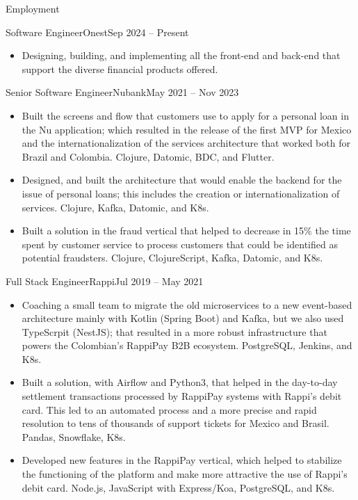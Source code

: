 \documentclass[calibri]{../macdowell-cv/mcdowellcv}
\begin{document}
	\makeheader
	
	\begin{cvsection}{Employment}
		\begin{cvsubsection}{Software Engineer}{Onest}{Sep 2024 -- Present}
			\begin{itemize}
                \item Designing, building, and implementing all the front-end
                    and back-end that support the diverse financial products
                    offered.
			\end{itemize}
		\end{cvsubsection}

		\begin{cvsubsection}{Senior Software Engineer}{Nubank}{May 2021 -- Nov 2023}
			\begin{itemize}
				\item Built the screens and flow that customers use to apply for a personal loan in the Nu application; which resulted in the release of the first MVP for Mexico and the internationalization of the services architecture that worked both for Brazil and Colombia. Clojure, Datomic, BDC, and Flutter.
				\item Designed, and built the architecture that would enable the backend for the issue of personal loans; this includes the creation or internationalization of services. Clojure, Kafka, Datomic, and K8s.
				\item Built a solution in the fraud vertical that helped to decrease in 15\% the time spent by customer service to process customers that could be identified as potential fraudsters. Clojure, ClojureScript, Kafka, Datomic, and K8s.
			\end{itemize}
		\end{cvsubsection}

		\begin{cvsubsection}{Full Stack Engineer}{Rappi}{Jul 2019 -- May 2021}
			\begin{itemize}
				\item Coaching a small team to migrate the old microservices to a new event-based architecture mainly with Kotlin (Spring Boot) and Kafka, but we also used TypeScrpit (NestJS); that resulted in a more robust infrastructure that powers the Colombian's RappiPay B2B ecosystem. PostgreSQL, Jenkins, and K8s.
				\item Built a solution, with Airflow and Python3, that helped in the day-to-day settlement transactions processed by RappiPay systems with Rappi's debit card. This led to an automated process and a more precise and rapid resolution to tens of thousands of support tickets for Mexico and Brasil. Pandas, Snowflake, K8s.
				\item Developed new features in the RappiPay vertical, which helped to stabilize the functioning of the platform and make more attractive the use of Rappi's debit card. Node.js, JavaScript with Express/Koa, PostgreSQL, and K8s.
			\end{itemize}
		\end{cvsubsection}


\end{cvsection}
\end{document}

